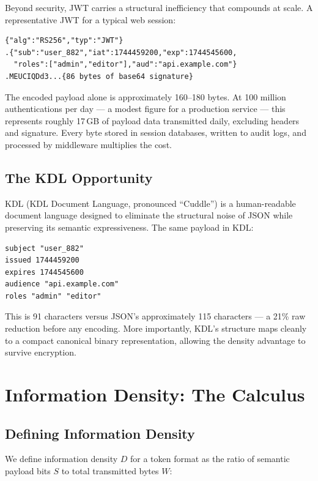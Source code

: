 \documentclass[11pt, letterpaper]{article}
\begin{document}
Beyond security, JWT carries a structural inefficiency that compounds at scale.
A representative JWT for a typical web session:

\begin{lstlisting}[language={}]
{"alg":"RS256","typ":"JWT"}
.{"sub":"user_882","iat":1744459200,"exp":1744545600,
  "roles":["admin","editor"],"aud":"api.example.com"}
.MEUCIQDd3...{86 bytes of base64 signature}
\end{lstlisting}

The encoded payload alone is approximately 160--180 bytes. At 100 million
authentications per day — a modest figure for a production service — this
represents roughly 17\,GB of payload data transmitted daily, excluding headers
and signature. Every byte stored in session databases, written to audit logs,
and processed by middleware multiplies the cost.

\subsection{The KDL Opportunity}

KDL (KDL Document Language, pronounced ``Cuddle'') is a human-readable document
language designed to eliminate the structural noise of JSON while preserving
its semantic expressiveness. The same payload in KDL:

\begin{lstlisting}[language=KDL]
subject "user_882"
issued 1744459200
expires 1744545600
audience "api.example.com"
roles "admin" "editor"
\end{lstlisting}

This is 91 characters versus JSON's approximately 115 characters — a 21\%
raw reduction before any encoding. More importantly, KDL's structure maps
cleanly to a compact canonical binary representation, allowing the density
advantage to survive encryption.

\section{Information Density: The Calculus}

\subsection{Defining Information Density}

We define information density $D$ for a token format as the ratio of semantic
payload bits $S$ to total transmitted bytes $W$:
\end{document}
